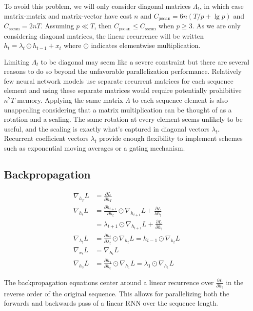 \documentclass{article}
\begin{document}
To avoid this problem, we will only consider diagonal matrices $\Lambda_t$, in which
case matrix-matrix and matrix-vector have cost $n$ and 
$C_\text{pscan}=6n(T/p + \lg p)$ and $C_\text{sscan}=2nT$. Assuming $p \ll T$, then 
$C_\text{pscan} \le C_\text{sscan}$ when $p \ge 3$.
As we are only considering diagonal matrices, the
linear recurrence will be written $h_t = \lambda_t \odot h_{t-1} + x_t$ where
$\odot$ indicates elementwise multiplication.

Limiting $\Lambda_t$ to be diagonal may seem like a severe constraint but there are
several reasons to do so beyond the unfavorable parallelization performance. Relatively few neural
network models use separate recurrent matrices for each sequence element and using these
separate matrices would require potentially prohibitive $n^2T$ memory. Applying
the same matrix $\Lambda$ to each sequence element is also unappealing considering that a matrix
multiplication can be thought of as a rotation and a scaling. The same rotation at every
element seems unlikely to be useful, and the scaling is exactly what's captured in diagonal
vectors $\lambda_t$. Recurrent coefficient vectors $\lambda_t$ provide enough flexibility
to implement schemes such as exponential moving averages or a gating mechanism.

\subsection{Backpropagation}
\begin{align*}
\nabla_{h_T}L &= \frac{\partial L}{\partial h_T} \\
\nabla_{h_t}L &= \frac{\partial h_{t+1}}{\partial h_t} \odot \nabla_{h_{t+1}} L + \frac{\partial L}{\partial h_t} \\ 
&= \lambda_{t+1} \odot \nabla_{h_{t+1}} L + \frac{\partial L}{\partial h_t} \\
\nabla_{\lambda_t}L &= \frac{\partial h_t}{\partial\lambda_t} \odot \nabla_{h_t}L = h_{t-1} \odot \nabla_{h_t}L \\
\nabla_{x_t}L &= \nabla_{h_t} L \\
\nabla_{h_0}L &=  \frac{\partial h_1}{\partial h_0} \odot \nabla_{h_1} L = \lambda_1 \odot \nabla_{h_1} L
\end{align*}

The backpropagation equations center around a linear recurrence over $\frac{\partial L}{\partial h_t}$ in the reverse order of the original sequence. This allows for parallelizing both the forwards and backwards pass of a linear RNN over the sequence length.
\end{document}
